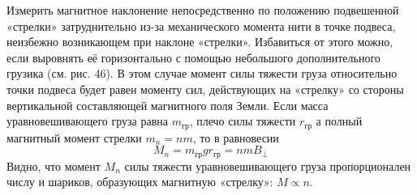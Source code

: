 \documentclass[12pt,a4paper]{article}
\begin{document}
Измерить магнитное наклонение непосредственно по положению подвешенной «стрелки» затруднительно из-за механического момента нити в точке подвеса, 
неизбежно возникающем при наклоне «стрелки». Избавиться от этого можно, если выровнять её горизонтально с помощью небольшого дополнительного 
грузика (см. рис. 46). В этом случае момент силы тяжести груза относительно точки подвеса будет равен моменту сил, действующих на «стрелку» 
со стороны вертикальной составляющей магнитного поля Земли. Если масса уравновешивающего груза
равна $m_{\text{гр}}$, плечо силы тяжести $r_{\text{гр}}$ а полный магнитный момент стрелки $m_n = nm$,
то в равновесии
\begin{equation}
    M_n = m_{\text{гр}} g r_{\text{гр}} = nmB_{\perp}
\end{equation}
Видно, что момент $M_n$ силы тяжести уравновешивающего груза пропорционален числу и шариков, образующих магнитную «стрелку»: $M \propto n$.
\end{document}
